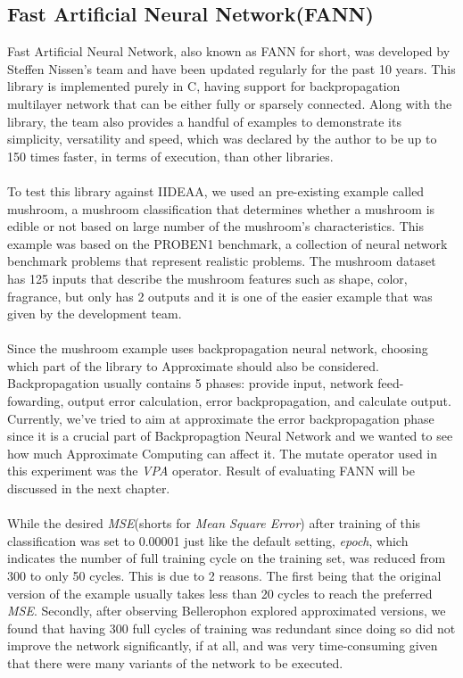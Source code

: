 \subsection{Fast Artificial Neural Network(FANN)}

Fast Artificial Neural Network\cite{fann}, also known as FANN for short, was developed by Steffen Nissen's team and have been updated regularly for the past 10 years. This library is implemented purely in C, having support for backpropagation multilayer network that can be either fully or sparsely connected. Along with the library, the team also provides a handful of examples to demonstrate its simplicity, versatility and speed, which was declared by the author to be up to 150 times faster, in terms of execution, than other libraries. \\
~\\
To test this library against IIDEAA, we used an pre-existing example called mushroom, a mushroom classification that determines whether a mushroom is edible or not based on large number of the mushroom's characteristics. This example was based on the PROBEN1 benchmark, a collection of neural network benchmark problems that represent realistic problems. The mushroom dataset has 125 inputs that describe the mushroom features such as shape, color, fragrance, but only has 2 outputs and it is one of the easier example that was given by the development team. \\
~\\
Since the mushroom example uses backpropagation neural network, choosing which part of the library to Approximate should also be considered. Backpropagation usually contains 5 phases: provide input, network feed-fowarding, output error calculation, error backpropagation, and calculate output. Currently, we've tried to aim at approximate the error backpropagation phase since it is a crucial part of Backpropagtion Neural Network and we wanted to see how much Approximate Computing can affect it. The mutate operator used in this experiment was the \textit{VPA} operator. Result of evaluating FANN will be discussed in the next chapter.\\
~\\
While the desired \textit{MSE}(shorts for \textit{Mean Square Error}) after training of this classification was set to 0.00001 just like the default setting, \textit{epoch}, which indicates the number of full training cycle on the training set, was reduced from 300 to only 50 cycles. This is due to 2 reasons. The first being that the original version of the example usually takes less than 20 cycles to reach the preferred \textit{MSE}. Secondly, after observing Bellerophon explored approximated versions, we found that having 300 full cycles of training was redundant since doing so did not improve the network significantly, if at all, and was very time-consuming given that there were many variants of the network to be executed. \\
